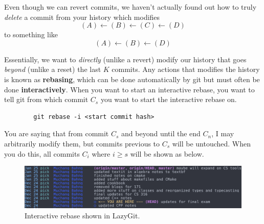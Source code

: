 \documentclass{article}
\begin{document}
    Even though we can revert commits, we haven't actually found out how to truly \textit{delete} a commit from your history which modifies 
    \begin{equation}
      (A) \leftarrow (B) \leftarrow (C) \leftarrow (D)
    \end{equation} 
    to something like 
    \begin{equation}
      (A) \leftarrow (B) \leftarrow (D)
    \end{equation} 
  
    \begin{definition}[Rebasing]
      Essentially, we want to \textit{directly} (unlike a revert) modify our history that goes \textit{beyond} (unlike a reset) the last $K$ commits. Any actions that modifies the history is known as \textbf{rebasing}, which can be done automatically by git but must often be done \textbf{interactively}. When you want to start an interactive rebase, you want to tell git from which commit $C_s$ you want to start the interactive rebase on. 
      \begin{lstlisting}
        git rebase -i <start commit hash>
      \end{lstlisting}
      You are saying that from commit $C_s$ and beyond until the end $C_n$, I may arbitrarily modify them, but commits previous to $C_s$ will be untouched. When you do this, all commits $C_i$ where $i \geq s$ will be shown as below. 

      \begin{figure}[H]
        \centering 
        \includegraphics[scale=0.3]{img/rebase.png}
        \caption{Interactive rebase shown in LazyGit.} 
        \label{fig:rebase}
      \end{figure}


\end{definition}
\end{document}
